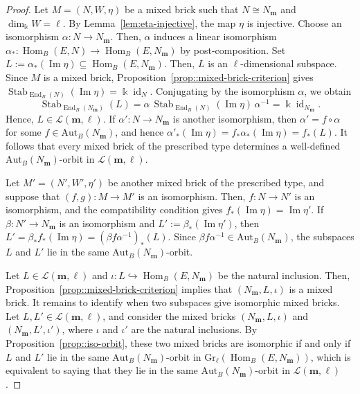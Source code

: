 \documentclass[a4,12pt]{amsart}
\numberwithin{equation}{section} %
\def\Hom{\operatorname{Hom}} %
\def\End{\operatorname{End}} %
\def\Im{\operatorname{Im}} %
\def\Stab{\operatorname{Stab}} %
\def\Gr{\mathrm{Gr}} %
\def\Aut{\mathrm{Aut}} %
\theoremstyle{definition} %
\begin{document}
\begin{proof} 
Let $M=(N,W,\eta)$ be a mixed brick such that $N\cong N_{\mathbf{m}}$ and $\dim_{\Bbbk} W=\ell$. By Lemma~\ref{lem:eta-injective}, the map $\eta$ is injective. Choose an isomorphism $\alpha\colon N\to N_{\mathbf{m}}$. Then, $\alpha$ induces a linear isomorphism $\alpha_*\colon \Hom_B(E,N)\to \Hom_B(E,N_{\mathbf{m}})$ by post-composition. Set $L:=\alpha_*(\Im\eta)\subseteq \Hom_B(E,N_{\mathbf{m}})$. Then, $L$ is an $\ell$-dimensional subspace. Since $M$ is a mixed brick, Proposition~\ref{prop::mixed-brick-criterion} gives $\Stab_{\End_B(N)}(\Im\eta)=\Bbbk\operatorname{id}_{N}$. Conjugating by the isomorphism $\alpha$, we obtain
\[
\Stab_{\End_B(N_{\mathbf{m}})}(L) = \alpha\,\Stab_{\End_B(N)}(\Im\eta)\,\alpha^{-1} = \Bbbk\operatorname{id}_{N_{\mathbf{m}}}.
\]
Hence, $L\in\mathcal{L}(\mathbf{m},\ell)$. If $\alpha'\colon N\to N_{\mathbf{m}}$ is another isomorphism, then $\alpha'=f\circ \alpha$ for some $f\in\Aut_B(N_{\mathbf{m}})$, and hence $\alpha'_*(\Im\eta)=f_*\alpha_*(\Im\eta)=f_*(L)$. It follows that every mixed brick of the prescribed type determines a well-defined $\Aut_B(N_{\mathbf{m}})$-orbit in $\mathcal{L}(\mathbf{m},\ell)$. 

Let $M'=(N',W',\eta')$ be another mixed brick of the prescribed type, and suppose that $(f,g)\colon M\to M'$ is an isomorphism. Then, $f\colon N\to N'$ is an isomorphism, and the compatibility condition gives $f_*(\Im\eta)=\Im\eta'$. If $\beta\colon N'\to N_{\mathbf{m}}$ is an isomorphism and $L':=\beta_*(\Im\eta')$, then $L'=\beta_*f_*(\Im\eta)=(\beta f\alpha^{-1})_*(L)$. Since $\beta f\alpha^{-1}\in\Aut_B(N_{\mathbf{m}})$, the subspaces $L$ and $L'$ lie in the same $\Aut_B(N_{\mathbf{m}})$-orbit.

Let $L\in\mathcal{L}(\mathbf{m},\ell)$ and $\iota\colon L\hookrightarrow \Hom_B(E,N_{\mathbf{m}})$ be the natural inclusion. Then,  Proposition~\ref{prop::mixed-brick-criterion} implies that $(N_{\mathbf{m}},L,\iota)$ is a mixed brick. It remains to identify when two subspaces give isomorphic mixed bricks. Let $L,L'\in\mathcal{L}(\mathbf{m},\ell)$, and consider the mixed bricks $(N_{\mathbf{m}},L,\iota)$ and $(N_{\mathbf{m}},L',\iota')$, where $\iota$ and $\iota'$ are the natural inclusions. By Proposition~\ref{prop::iso-orbit}, these two mixed bricks are isomorphic if and only if $L$ and $L'$ lie in the same $\Aut_B(N_{\mathbf{m}})$-orbit in $\Gr_\ell(\Hom_B(E,N_{\mathbf{m}}))$, which is equivalent to saying that they lie in the same $\Aut_B(N_{\mathbf{m}})$-orbit in $\mathcal{L}(\mathbf{m},\ell)$. 
\end{proof}
\end{document}
